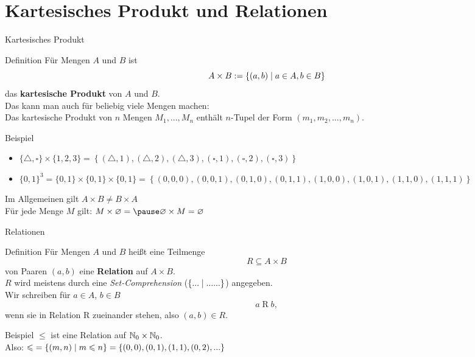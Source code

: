 \section{Kartesisches Produkt und Relationen}

\begin{frame}{Kartesisches Produkt}
	\begin{block}{Definition}
		Für Mengen $A$ und $B$ ist
		$$A \times B := \left\{ (a,b) \;\middle|\; a \in A, b \in B \right\}$$
		das \textbf{kartesische Produkt} von $A$ und $B$. \\
		\impl Das kann man auch für beliebig viele Mengen machen: \\
			Das kartesische Produkt von $n$ Mengen $M_1,...,M_n$ enthält $n$-Tupel der Form $(m_1, m_2, ..., m_n)$.
	\end{block}

	\pause
	\begin{exampleblock}{Beispiel}
		\begin{itemize}
			\item $\{\triangle,\square\} \times \{1, 2, 3\} = \left\{(\triangle, 1), (\triangle, 2), (\triangle, 3), (\square, 1), (\square, 2), (\square, 3)\right\}$ 
			\item 	$\{0, 1\}^3 = \{0,1\} \times \{0,1\} \times \{0,1\} = \left\{(0, 0, 0), (0, 0, 1), (0, 1, 0), (0, 1, 1), (1, 0, 0), (1, 0, 1), (1, 1, 0), (1, 1, 1)\right\} $
		\end{itemize}
		
		\pause
	   Im Allgemeinen gilt $ A \times B \neq B \times A $\\
	   Für jede Menge $M$ gilt: $ M \times \emptyset = \pause \emptyset \times M = \emptyset$
	\end{exampleblock}
\end{frame}

\begin{frame}{Relationen}
	\begin{block}{Definition}
		Für Mengen $A$ und $B$ heißt eine Teilmenge 
		$$R \subseteq A \times B$$
		von Paaren $(a,b)$ eine \textbf{Relation} auf $A \times B$. \\
		\smallskip
		$R$ wird meistens durch eine \emph{Set-Comprehension} ($\left\{... \vphantom{(} \;\middle|\; ......\right\}$) angegeben. \\
		\smallskip
		Wir schreiben für $a \in A$, $b \in B$ 
		$$a \mathrel{R} b, $$
		wenn sie in Relation R zueinander stehen, also $(a, b) \in R$.
	\end{block}
	
	\pause
	\begin{exampleblock}{Beispiel} 
		$\leq$ ist eine Relation auf $\mathbb{N}_0 \times \mathbb{N}_0 $. \\
		Also: $ \text{$\leqslant$} = \left\{(m, n) \;\middle|\; m \leqslant n \right\} = \{(0, 0), (0, 1), (1, 1), (0, 2), ...\} $
	\end{exampleblock}
\end{frame}

